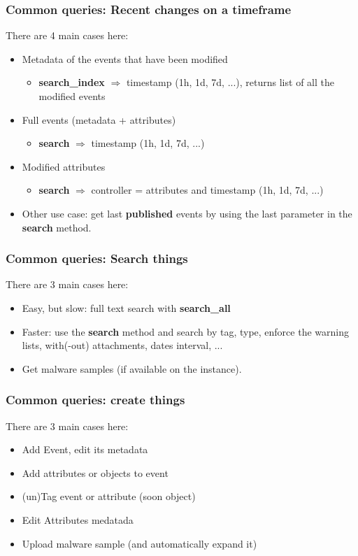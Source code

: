 \begin{frame}
    \frametitle{Common queries: Recent changes on a timeframe}
	There are 4 main cases here:
    \begin{itemize}
		\item Metadata of the events that have been modified
		\begin{itemize}
            \item {\bf search\_index} $\Rightarrow$ timestamp (1h, 1d, 7d, ...), returns list of all the modified events
		\end{itemize}
		\item Full events (metadata + attributes)
		\begin{itemize}
    		\item {\bf search} $\Rightarrow$ timestamp (1h, 1d, 7d, ...)
		\end{itemize}
		\item Modified attributes
		\begin{itemize}
    		\item {\bf search} $\Rightarrow$ controller = attributes and timestamp (1h, 1d, 7d, ...)
		\end{itemize}
		\item Other use case: get last {\bf published} events by using the last parameter in the {\bf search} method.
    \end{itemize}
\end{frame}

\begin{frame}
	\frametitle{Common queries: Search things}
	There are 3 main cases here:
	\begin{itemize}
		\item Easy, but slow: full text search with {\bf search\_all}
		\item Faster: use the {\bf search} method and search by tag, type, enforce the warning lists, with(-out) attachments, dates interval, ...
		\item Get malware samples (if available on the instance).
	\end{itemize}
\end{frame}

\begin{frame}
	\frametitle{Common queries: create things}
	There are 3 main cases here:
	\begin{itemize}
		\item Add Event, edit its metadata
		\item Add attributes or objects to event
		\item (un)Tag event or attribute (soon object)
		\item Edit Attributes medatada
		\item Upload malware sample (and automatically expand it)
	\end{itemize}
\end{frame}

